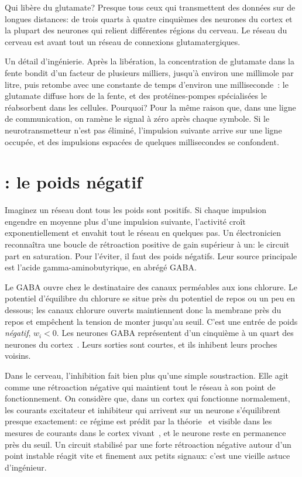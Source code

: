 Qui libère du glutamate? Presque tous ceux qui transmettent des données sur de longues distances: de trois quarts à quatre cinquièmes des neurones du cortex et la plupart des neurones qui relient différentes régions du cerveau. Le réseau du cerveau est avant tout un réseau de connexions glutamatergiques.

Un détail d'ingénierie. Après la libération, la concentration de glutamate dans la fente bondit d'un facteur de plusieurs milliers, jusqu'à environ une millimole par litre, puis retombe avec une constante de temps d'environ une milliseconde~\cite{Clements1992}: le glutamate diffuse hors de la fente, et des protéines-pompes spécialisées le réabsorbent dans les cellules. Pourquoi? Pour la même raison que, dans une ligne de communication, on ramène le signal à zéro après chaque symbole. Si le neurotransmetteur n'est pas éliminé, l'impulsion suivante arrive sur une ligne \og occupée\fg, et des impulsions espacées de quelques millisecondes se confondent.

\section{: le poids négatif}

Imaginez un réseau dont tous les poids sont positifs. Si chaque impulsion engendre en moyenne plus d'une impulsion suivante, l'activité croît exponentiellement et envahit tout le réseau en quelques pas. Un électronicien reconnaîtra une boucle de rétroaction positive de gain supérieur à un: le circuit part en saturation. Pour l'éviter, il faut des poids négatifs. Leur source principale est l'acide gamma-aminobutyrique, en abrégé GABA.

Le GABA ouvre chez le destinataire des canaux perméables aux ions chlorure. Le potentiel d'équilibre du chlorure se situe près du potentiel de repos ou un peu en dessous; les canaux chlorure ouverts maintiennent donc la membrane près du repos et empêchent la tension de monter jusqu'au seuil. C'est une entrée de poids \emph{négatif}, $w_i<0$. Les neurones GABA représentent d'un cinquième à un quart des neurones du cortex~\cite{Hendry1987}. Leurs sorties sont courtes, et ils inhibent leurs proches voisins.

Dans le cerveau, l'inhibition fait bien plus qu'une simple soustraction. Elle agit comme une rétroaction négative qui maintient tout le réseau à son point de fonctionnement. On considère que, dans un cortex qui fonctionne normalement, les courants excitateur et inhibiteur qui arrivent sur un neurone s'équilibrent presque exactement: ce régime est prédit par la théorie~\cite{vanVreeswijk1996} et visible dans les mesures de courants dans le cortex vivant~\cite{Haider2006}, et le neurone reste en permanence près du seuil. Un circuit stabilisé par une forte rétroaction négative autour d'un point instable réagit vite et finement aux petits signaux: c'est une vieille astuce d'ingénieur.


